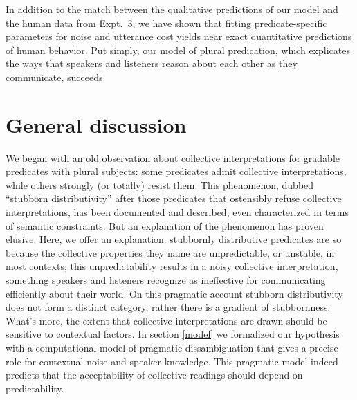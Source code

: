 \documentclass[linguex]{sp}
\begin{document}
In addition to the match between the qualitative predictions of our model and the human data from Expt.~3, we have shown that fitting predicate-specific parameters for noise and utterance cost yields near exact quantitative predictions of human behavior. Put simply, our model of plural predication, which explicates the ways that speakers and listeners reason about each other as they communicate, succeeds. %


\section{General discussion}

We began with an old observation about collective interpretations for gradable predicates with plural subjects: some predicates admit collective interpretations, while others strongly (or totally) resist them. This phenomenon, dubbed ``stubborn distributivity'' after those predicates that ostensibly refuse collective interpretations, has been documented and described, even characterized in terms of semantic constraints. But an explanation of the phenomenon has proven elusive. Here, we offer an explanation: stubbornly distributive predicates are so because the collective properties they name are unpredictable, or unstable, in most contexts; this unpredictability results in a noisy collective interpretation, something speakers and listeners recognize as ineffective for communicating efficiently about their world.
On this pragmatic account stubborn distributivity does not form a distinct category, rather there is a gradient of stubbornness. What's more, the extent that collective interpretations are drawn should be sensitive to contextual factors.
In section \ref{model} we formalized our hypothesis with a computational model of pragmatic dissambiguation that gives a precise role for contextual noise and speaker knowledge. This pragmatic model indeed predicts that the acceptability of collective readings should depend on predictability. 

\end{document}
